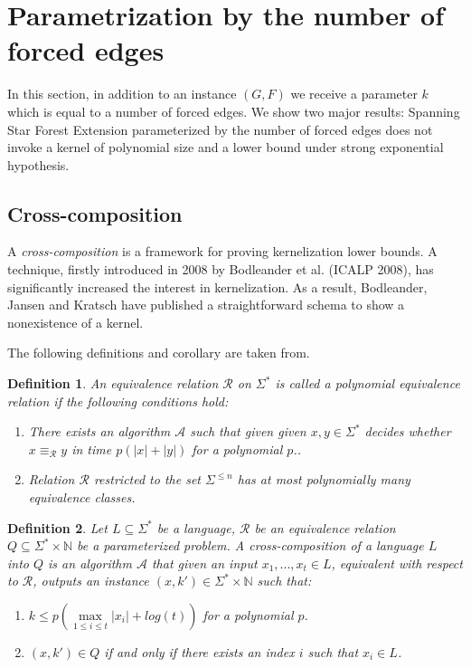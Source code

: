 \documentclass[en]{pracamgr}
\newtheorem{definition}{Definition}
\newcommand{\ssfep}{{\sc Spanning Star Forest Extension}}
\begin{document}
\section{Parametrization by the number of forced edges}

In this section, in addition to an instance $(G,F)$ we receive a parameter $k$ which is equal to a number of forced edges. We show two major results: \ssfep{} parameterized by the number of forced edges does not invoke a kernel of polynomial size and a lower bound under strong exponential hypothesis.

\subsection{Cross-composition}

A \emph{cross-composition} is a framework for proving kernelization lower bounds. A technique, firstly introduced in 2008 by Bodleander et al. (ICALP 2008), has significantly increased the interest in kernelization. As a result, Bodleander, Jansen and Kratsch have published a straightforward schema to show a nonexistence of a kernel.

The following definitions and corollary are taken from. %

\begin{definition}\label{polynomial equivalence relation}
	An equivalence relation $\mathcal{R}$ on $\Sigma^*$ is called a \textup{polynomial equivalence relation} if the following conditions hold:
	\begin{enumerate}
		\item There exists an algorithm $\mathcal{A}$ such that given given $x,y \in \Sigma^*$ decides whether $x \equiv_{\mathcal{R}} y$ in time $p(|x|+|y|)$ for a polynomial $p$..
		\item Relation $\mathcal{R}$ restricted to the set $\Sigma^{\leq n}$ has at most polynomially many equivalence classes.
	\end{enumerate}
\end{definition}

\begin{definition}\label{cross-composition}
	Let $L \subseteq \Sigma^*$ be a language, $\mathcal{R}$ be an equivalence relation $Q \subseteq \Sigma^* \times \mathbb{N}$ be a parameterized problem. A \textup{cross-composition} of a language $L$ into $Q$ is an algorithm $\mathcal{A}$ that given an input $x_1,...,x_t \in L$, equivalent with respect to $\mathcal{R}$, outputs an instance $(x,k') \in \Sigma^* \times \mathbb{N}$ such that:
	\begin{enumerate}
		\item $k \leq p(\max\limits_{1 \leq i \leq t} |x_i| + log(t))$ for a polynomial $p$.
		\item $(x,k') \in Q$ if and only if there exists an index $i$ such that $x_i \in L$.
	\end{enumerate}
\end{definition}
\end{document}
